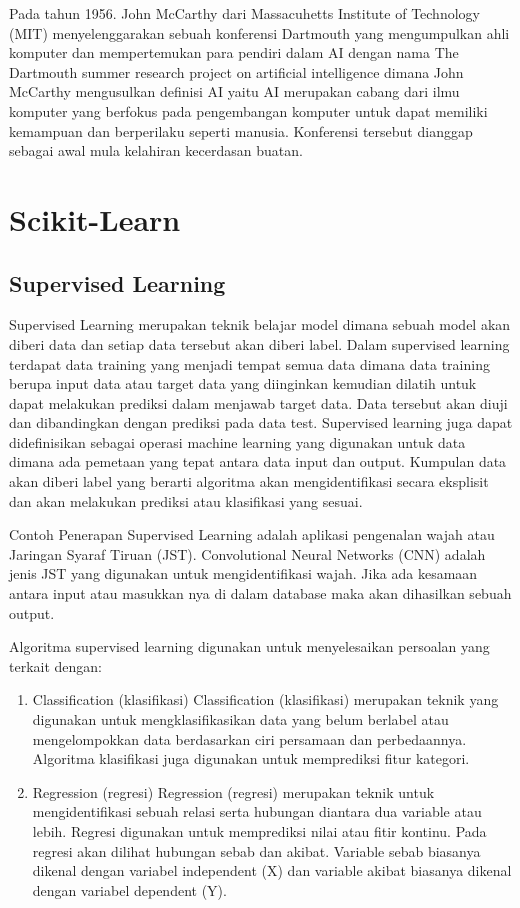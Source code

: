    Pada tahun 1956. John McCarthy dari Massacuhetts Institute of Technology (MIT) menyelenggarakan sebuah konferensi Dartmouth yang mengumpulkan ahli komputer dan mempertemukan para pendiri dalam AI dengan nama The Dartmouth summer research project on artificial intelligence dimana John McCarthy mengusulkan definisi AI yaitu AI merupakan cabang dari ilmu komputer yang berfokus pada pengembangan komputer untuk dapat memiliki kemampuan dan berperilaku seperti manusia. Konferensi tersebut dianggap sebagai awal mula kelahiran kecerdasan buatan.

    \section{Scikit-Learn}
    \subsection{Supervised Learning}
    Supervised Learning merupakan teknik belajar model dimana sebuah model akan diberi data dan setiap data tersebut akan diberi label. Dalam supervised learning terdapat data training yang menjadi tempat semua data dimana data training berupa input data atau target data yang diinginkan kemudian dilatih untuk dapat melakukan prediksi  dalam menjawab target data. Data tersebut akan diuji dan dibandingkan dengan prediksi pada data test. Supervised learning juga dapat didefinisikan sebagai operasi machine learning yang digunakan untuk data dimana ada pemetaan yang tepat antara data input dan output. Kumpulan data akan diberi label yang berarti algoritma akan mengidentifikasi secara eksplisit dan akan melakukan prediksi atau klasifikasi yang sesuai. 

    Contoh Penerapan Supervised Learning adalah aplikasi pengenalan wajah atau Jaringan Syaraf Tiruan (JST). Convolutional Neural Networks (CNN) adalah jenis JST yang digunakan untuk mengidentifikasi wajah. Jika ada kesamaan antara input atau masukkan nya di dalam database maka akan dihasilkan sebuah output.

    Algoritma supervised learning digunakan untuk menyelesaikan persoalan yang terkait dengan:
        \begin{enumerate}
        \item Classification (klasifikasi)
        \newline Classification (klasifikasi) merupakan teknik yang digunakan untuk mengklasifikasikan data yang belum berlabel atau mengelompokkan data berdasarkan ciri persamaan dan perbedaannya. Algoritma klasifikasi juga digunakan untuk memprediksi fitur kategori.

        \item Regression (regresi)
        \newline Regression (regresi) merupakan teknik untuk mengidentifikasi sebuah relasi serta hubungan diantara dua variable atau lebih.  Regresi digunakan untuk memprediksi nilai atau fitir kontinu. Pada regresi akan dilihat hubungan sebab dan akibat. Variable sebab biasanya dikenal dengan variabel independent (X) dan variable akibat biasanya dikenal dengan variabel dependent (Y).
        \end{enumerate}

